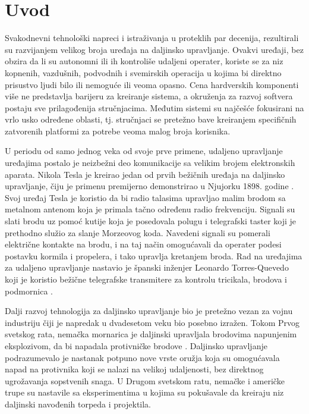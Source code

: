 \documentclass[12pt,a4paper]{report}
\begin{document}
\tableofcontents

\chapter{Uvod}
Svakodnevni tehnološki napreci i istraživanja u proteklih par decenija, rezultirali su razvijanjem velikog broja uređaja na daljinsko upravljanje. Ovakvi uređaji, bez obzira da li su autonomni ili ih kontroliše udaljeni operater, koriste se za niz kopnenih, vazdušnih, podvodnih i svemirskih operacija u kojima bi direktno prisustvo ljudi bilo ili nemoguće ili veoma opasno. Cena hardverskih komponenti više ne predstavlja barijeru za kreiranje sistema, a okruženja za razvoj softvera postaju sve prilagođenija stručnjacima. Međutim sistemi su najčešće fokusirani na vrlo usko određene oblasti, tj. stručnjaci se pretežno bave kreiranjem specifičnih zatvorenih platformi za potrebe veoma malog broja korisnika.

U periodu od samo jednog veka od svoje prve primene, udaljeno upravljanje uređajima postalo je neizbežni deo komunikacije sa velikim brojem elektronskih aparata. Nikola Tesla je kreirao jedan od prvih bežičnih uređaja na daljinsko upravljanje, čiju je primenu premijerno demonstrirao u Njujorku 1898. godine \cite{tesla}. Svoj uređaj Tesla je koristio da bi radio talasima upravljao malim brodom sa metalnom antenom koja je primala tačno određenu radio frekvenciju. Signali su slati brodu uz pomoć kutije koja je posedovala polugu i telegrafski taster koji je prethodno služio za slanje Morzeovog koda. Navedeni signali su pomerali električne kontakte na brodu, i na taj način omogućavali da operater podesi postavku kormila i propelera, i tako upravlja kretanjem broda. Rad na uređajima za udaljeno upravljanje nastavio je španski inženjer Leonardo Torres-Quevedo koji je koristio bežične telegrafske transmitere za kontrolu tricikala, brodova i podmornica \cite{leonardo}.

Dalji razvoj tehnologija za daljinsko upravljanje bio je pretežno vezan za vojnu industriju čiji je napredak u dvadesetom veku bio posebno izražen. Tokom Prvog svetskog rata, nemačka mornarica je daljinski upravljala brodovima napunjenim eksplozivom, da bi napadala protivničke brodove \cite{intro-rest}. Daljinsko upravljanje podrazumevalo je nastanak potpuno nove vrste oružja koja su omogućavala napad na protivnika koji se nalazi na velikoj udaljenosti, bez direktnog ugrožavanja sopstvenih snaga. U Drugom svetskom ratu, nemačke i američke trupe su nastavile sa eksperimentima u kojima su pokušavale da kreiraju niz daljinski navođenih torpeda i projektila.
\end{document}
